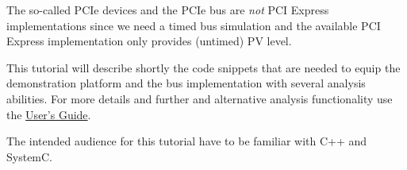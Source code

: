 The so-called PCIe devices and the PCIe bus are {\em not} PCI Express implementations since we need a timed bus simulation and the available \GreenBus PCI Express implementation only provides (untimed) PV level.

This tutorial will describe shortly the code snippets that are needed to equip the demonstration platform and the bus implementation with several analysis abilities. For more details and further and alternative analysis functionality use the \hypertarget{GAVUsersGuide}{\href{http://www.greensocs.com/en/projects/GreenControl/GreenAV/docs/GAVUsersGuide}{\GreenAV User's Guide}}.

The intended audience for this tutorial have to be familiar with C++ and SystemC.
